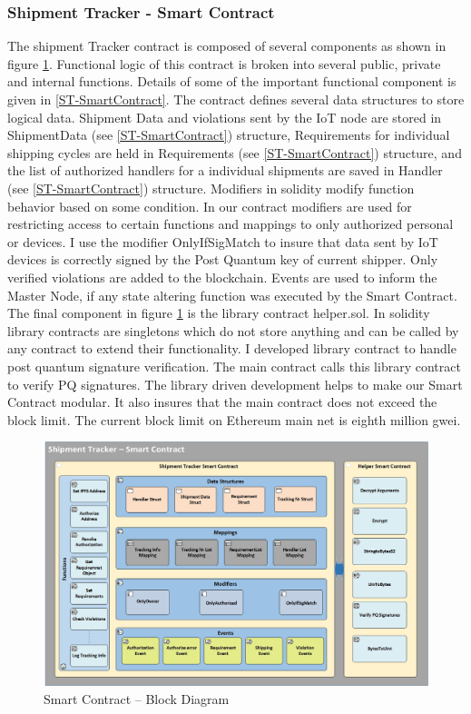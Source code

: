 \subsubsection{Shipment Tracker - Smart Contract} \label{ST-SC} 
The shipment Tracker contract is composed of several components as shown in figure \ref{fig:ArchitectureSC}. Functional logic of this contract is broken into several public, private and internal functions. Details of some of the important functional component is given in \ref{ST-SmartContract}.  The contract defines several data structures to store logical data. Shipment Data and violations sent by the IoT node are stored in ShipmentData (see \ref{ST-SmartContract}) structure, Requirements for individual shipping cycles are held in Requirements (see \ref{ST-SmartContract}) structure, and the list of authorized handlers for a individual shipments are saved in Handler (see \ref{ST-SmartContract}) structure. Modifiers in solidity modify function behavior based on some condition. In our contract modifiers are used for restricting access to certain functions and mappings to only authorized personal or devices. I use the modifier OnlyIfSigMatch to insure that data sent by IoT devices is correctly signed by the Post Quantum key of current shipper. Only verified violations are added to the blockchain. Events are used to inform the Master Node, if any state altering function was executed by the Smart Contract. The final component in figure \ref{fig:ArchitectureSC} is the library contract helper.sol. In solidity library contracts are singletons which do not store anything and can be called by any contract to extend their functionality. I developed library contract to handle post quantum signature verification. The main contract calls this library contract to verify PQ signatures. The library driven development helps to make our Smart Contract modular. It also insures that the main contract does not exceed the block limit. The current block limit on Ethereum main net is eighth million gwei.  
\begin{figure}[h]
	\centering
    \includegraphics[width=180mm,scale=1]{figs/SC-BD}
	\caption{Smart Contract – Block Diagram}
	\label{fig:ArchitectureSC} 
\end{figure}
\clearpage



